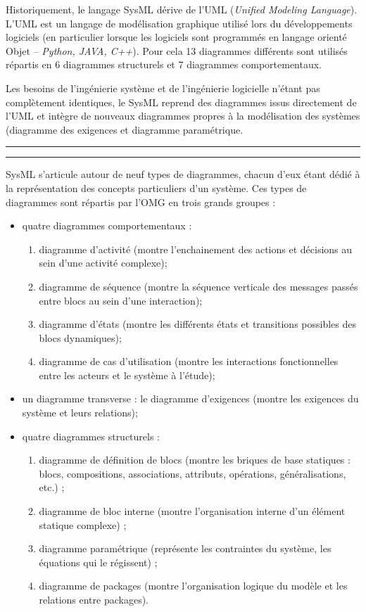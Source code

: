 \documentclass[11pt,oneside]{article}
\begin{document}
Historiquement, le langage SysML dérive de l'UML (\textit{Unified Modeling Language}). L'UML est un langage de modélisation graphique utilisé lors du développements logiciels (en particulier lorsque les logiciels sont programmés en langage orienté Objet -- \textit{Python, JAVA, C++}). Pour cela 13 diagrammes différents sont utilisés répartis en 6 diagrammes structurels et 7 diagrammes comportementaux. 

Les besoins de l'ingénierie système et de l'ingénierie logicielle n'étant pas complètement identiques, le SysML reprend des diagrammes issus directement de l'UML et intègre de nouveaux diagrammes propres à la modélisation des systèmes (diagramme des exigences et diagramme paramétrique. 



\begin{center}
\noindent\rule[0.5ex]{.45\textwidth}{0.1mm} \hfill \cite{roques}\hfill 
\rule[0.5ex]{.45\textwidth}{0.1mm}
\end{center}


SysML s’articule autour de neuf types de diagrammes, chacun d’eux étant dédié à la
représentation des concepts particuliers d’un système. Ces types de diagrammes sont
répartis par l’OMG en trois grands groupes :
\begin{itemize}
\item quatre diagrammes comportementaux :
\begin{enumerate}
\item diagramme d’activité (montre l’enchainement des actions et décisions au sein d’une
activité complexe);
\item diagramme de séquence (montre la séquence verticale des messages passés entre
blocs au sein d’une interaction);
\item diagramme d’états (montre les différents états et transitions possibles des blocs
dynamiques);
\item diagramme de cas d’utilisation (montre les interactions fonctionnelles entre les
acteurs et le système à l’étude);
\end{enumerate}
\item un diagramme transverse : le diagramme d’exigences (montre les exigences du système
et leurs relations);
\item quatre diagrammes structurels :
\begin{enumerate}
\item diagramme de définition de blocs (montre les briques de base statiques : blocs,
compositions, associations, attributs, opérations, généralisations, etc.) ;
\item diagramme de bloc interne (montre l’organisation interne d’un élément statique
complexe) ;
\item diagramme paramétrique (représente les contraintes du système, les équations qui le
régissent) ;
\item diagramme de packages (montre l’organisation logique du modèle et les relations
entre packages).
\end{enumerate}
\end{itemize}
\end{document}
